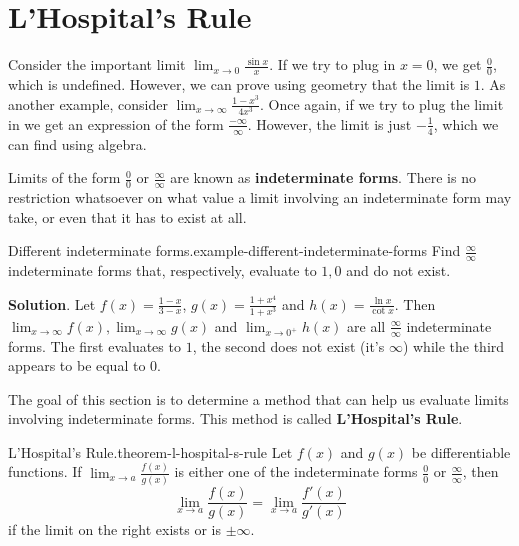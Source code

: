 \documentclass[10pt,]{book}
\newcommand{\terminology}[1]{\textbf{#1}}
\numberwithin{equation}{section}
\begin{document}
\section[{L'Hospital's Rule}]{L'Hospital's Rule}\label{section-l-hospital-s-rule}
\hypertarget{p-282}{}%
Consider the important limit \(\lim_{x\to0}\frac{\sin x}{x}\). If we try to plug in \(x=0\), we get \(\frac{0}{0}\), which is undefined. However, we can prove using geometry that the limit is \(1\). As another example, consider \(\lim_{x\to\infty}\frac{1-x^{3}}{4x^{3}}\). Once again, if we try to plug the limit in we get an expression of the form \(\frac{-\infty}{\infty}\). However, the limit is just \(-\frac{1}{4}\), which we can find using algebra.%
\par
\hypertarget{p-283}{}%
Limits of the form \(\frac{0}{0}\) or \(\frac{\infty}{\infty}\) are known as \terminology{indeterminate forms}. There is no restriction whatsoever on what value a limit involving an indeterminate form may take, or even that it has to exist at all.%
\begin{example}{Different indeterminate forms.}{example-different-indeterminate-forms}%
\hypertarget{p-284}{}%
Find \(\frac{\infty}{\infty}\) indeterminate forms that, respectively, evaluate to \(1, 0\) and do not exist.%
\par\smallskip%
\noindent\textbf{Solution}.\hypertarget{solution-62}{}\quad%
\hypertarget{p-285}{}%
Let \(f(x) = \frac{1-x}{3-x}\), \(g(x) = \frac{1+x^{4}}{1+x^{3}}\) and \(h(x) = \frac{\ln x}{\cot x}\). Then \(\lim_{x\to\infty}f(x), \lim_{x\to\infty}g(x)\) and \(\lim_{x\to0^{+}}h(x)\) are all \(\frac{\infty}{\infty}\) indeterminate forms. The first evaluates to \(1\), the second does not exist (it's \(\infty\)) while the third appears to be equal to \(0\).%
\end{example}
\hypertarget{p-286}{}%
The goal of this section is to determine a method that can help us evaluate limits involving indeterminate forms. This method is called \terminology{L'Hospital's Rule}.%
\begin{theorem}{L'Hospital's Rule.}{}{theorem-l-hospital-s-rule}%
\hypertarget{p-287}{}%
Let \(f(x)\) and \(g(x)\) be differentiable functions. If \(\lim_{x\to a}\frac{f(x)}{g(x)}\) is either one of the indeterminate forms \(\frac{0}{0}\) or \(\frac{\infty}{\infty}\), then%
\begin{equation*}
\lim_{x\to a}\frac{f(x)}{g(x)} = \lim_{x\to a}\frac{f'(x)}{g'(x)}
\end{equation*}
if the limit on the right exists or is \(\pm\infty\).%
\end{theorem}
\end{document}

